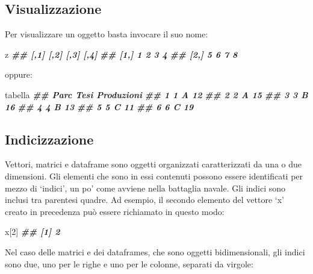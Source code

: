 \documentclass[
  12pt,
]{book}
\newenvironment{Shaded}{\begin{snugshade}}{\end{snugshade}}
\newcommand{\DecValTok}[1]{\textcolor[rgb]{0.00,0.00,0.81}{#1}}
\newcommand{\DocumentationTok}[1]{\textcolor[rgb]{0.56,0.35,0.01}{\textbf{\textit{#1}}}}
\newcommand{\NormalTok}[1]{#1}
\begin{document}
\hypertarget{visualizzazione}{%
\subsection{Visualizzazione}\label{visualizzazione}}

Per visualizzare un oggetto basta invocare il suo nome:

\begin{Shaded}
\begin{Highlighting}[]
\NormalTok{z}
\DocumentationTok{\#\#      [,1] [,2] [,3] [,4]}
\DocumentationTok{\#\# [1,]    1    2    3    4}
\DocumentationTok{\#\# [2,]    5    6    7    8}
\end{Highlighting}
\end{Shaded}

oppure:

\begin{Shaded}
\begin{Highlighting}[]
\NormalTok{tabella}
\DocumentationTok{\#\#   Parc Tesi Produzioni}
\DocumentationTok{\#\# 1    1    A         12}
\DocumentationTok{\#\# 2    2    A         15}
\DocumentationTok{\#\# 3    3    B         16}
\DocumentationTok{\#\# 4    4    B         13}
\DocumentationTok{\#\# 5    5    C         11}
\DocumentationTok{\#\# 6    6    C         19}
\end{Highlighting}
\end{Shaded}

\hypertarget{indicizzazione}{%
\subsection{Indicizzazione}\label{indicizzazione}}

Vettori, matrici e dataframe sono oggetti organizzati caratterizzati da una o due dimensioni. Gli elementi che sono in essi contenuti possono essere identificati per mezzo di `indici', un po' come avviene nella battaglia navale. Gli indici sono inclusi tra parentesi quadre. Ad esempio, il secondo elemento del vettore `x' creato in precedenza può essere richiamato in questo modo:

\begin{Shaded}
\begin{Highlighting}[]
\NormalTok{x[}\DecValTok{2}\NormalTok{]}
\DocumentationTok{\#\# [1] 2}
\end{Highlighting}
\end{Shaded}

Nel caso delle matrici e dei dataframes, che sono oggetti bidimensionali, gli indici sono due, uno per le righe e uno per le colonne, separati da virgole:
\end{document}
